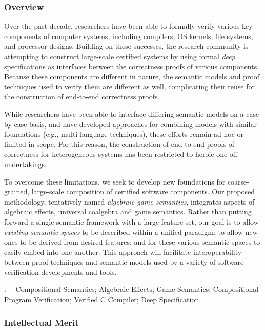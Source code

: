 \subsubsection*{Overview}

Over the past decade, researchers have been able to formally
verify various key components of computer systems, including compilers,
OS kernels, file systems, and processor designs.
Building on these
successes, the research community is attempting to construct
large-scale certified systems by using formal {\em deep}
specifications as interfaces between the correctness proofs of various
components.
Because these components are different in nature,
the semantic models and proof techniques
used to verify them
are different as well,
complicating their reuse for the construction of
end-to-end correctness proofs.

While researchers have been able to interface
differing semantic models on a case-by-case basis,
and have developed approaches for combining
models with similar foundations
(e.g., multi-language techniques),
these efforts remain ad-hoc or limited in scope.
For this reason,
the construction of end-to-end proofs of correctness
for heterogeneous systems has been restricted to
heroic one-off undertakings.

To overcome these limitations,
we seek to develop new foundations for
coarse-grained, large-scale composition of
certified software components.
Our proposed methodology,
tentatively named \emph{algebraic game semantics},
integrates aspects of
algebraic effects, universal coalgebra and game semantics.
Rather than putting forward
a single semantic framework with a large feature set,
our goal is to allow \emph{existing semantic spaces}
to be described within a unified paradigm;
to allow new ones to be derived from desired features;
and for these various semantic spaces to easily embed into one another.
This approach will facilitate interoperability
between proof techniques and semantic models used by
a variety of software verification developments and tools.

\vspace{+2mm}
:~~{%
Compositional Semantics;
Algebraic Effects;
Game Semantics;
Compositional Program Verification;
Verified C Compiler;
Deep Specification.}

\subsubsection*{Intellectual Merit}

